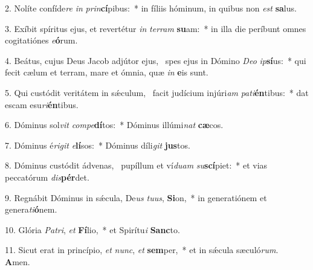 2. Nolíte confíde\textit{re} \textit{in} \textit{prin}\textbf{cí}pibus:~*  in fíliis hóminum, in quibus non \textit{est} \textbf{sa}lus.\

3. Exíbit spíritus ejus, et revertétur \textit{in} \textit{ter}\textit{ram} \textbf{su}am:~*  in illa die períbunt omnes cogitatiónes \textit{e}\textbf{ó}rum.\

4. Beátus, cujus Deus Jacob adjútor ejus, \dag\  spes ejus in Dómino \textit{De}\textit{o} \textit{ip}\textbf{sí}us:~*  qui fecit cælum et terram, mare et ómnia, quæ \textit{in} \textbf{e}is sunt.\

5. Qui custódit veritátem in sǽculum, \dag\  facit judícium injúri\textit{am} \textit{pa}\textit{ti}\textbf{én}tibus:~*  dat escam esu\textit{ri}\textbf{én}tibus.\

6. Dóminus sol\textit{vit} \textit{com}\textit{pe}\textbf{dí}tos:~*  Dóminus illúmi\textit{nat} \textbf{cæ}cos.\

7. Dóminus é\textit{ri}\textit{git} \textit{e}\textbf{lí}sos:~*  Dóminus díli\textit{git} \textbf{jus}tos.\

8. Dóminus custódit ádvenas, \dag\  pupíllum et ví\textit{du}\textit{am} \textit{su}\textbf{scí}piet:~*  et vias peccatórum \textit{dis}\textbf{pér}det.\

9. Regnábit Dóminus in sǽcula, De\textit{us} \textit{tu}\textit{us}, \textbf{Si}on,~*  in generatiónem et genera\textit{ti}\textbf{ó}nem.\

10. Glória \textit{Pa}\textit{tri}, \textit{et} \textbf{Fí}lio,~*  et Spirítu\textit{i} \textbf{Sanc}to.\

11. Sicut erat in princípio, \textit{et} \textit{nunc}, \textit{et} \textbf{sem}per,~*  et in sǽcula sæculó\textit{rum}. \textbf{A}men.\

